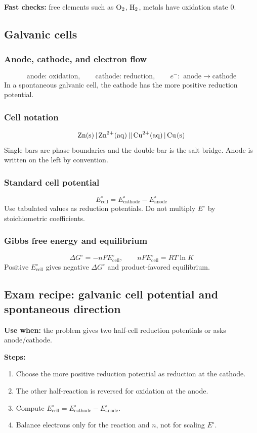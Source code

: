 \textbf{Fast checks:} free elements such as \(\ce{O2}\), \(\ce{H2}\), metals have oxidation state \(0\).

\subsection{Galvanic cells}

\subsubsection{Anode, cathode, and electron flow}
\[
\text{anode: oxidation}, \qquad \text{cathode: reduction}, \qquad e^-:\text{ anode}\rightarrow\text{cathode}
\]
In a spontaneous galvanic cell, the cathode has the more positive reduction potential.

\subsubsection{Cell notation}
\[
\ce{Zn(s) | Zn^2+(aq) || Cu^2+(aq) | Cu(s)}
\]
Single bars are phase boundaries and the double bar is the salt bridge. Anode is written on the left by convention.

\subsubsection{Standard cell potential}
\[
E^\circ_{\mathrm{cell}}=E^\circ_{\mathrm{cathode}}-E^\circ_{\mathrm{anode}}
\]
Use tabulated values as reduction potentials. Do not multiply \(E^\circ\) by stoichiometric coefficients.

\subsubsection{Gibbs free energy and equilibrium}
\[
\Delta G^\circ=-nFE^\circ_{\mathrm{cell}}, \qquad
nFE^\circ_{\mathrm{cell}}=RT\ln K
\]
Positive \(E^\circ_{\mathrm{cell}}\) gives negative \(\Delta G^\circ\) and product-favored equilibrium.

\subsection{Exam recipe: galvanic cell potential and spontaneous direction}
\textbf{Use when:} the problem gives two half-cell reduction potentials or asks anode/cathode.

\textbf{Steps:}
\begin{enumerate}
    \item Choose the more positive reduction potential as reduction at the cathode.
    \item The other half-reaction is reversed for oxidation at the anode.
    \item Compute \(E^\circ_{\mathrm{cell}}=E^\circ_{\mathrm{cathode}}-E^\circ_{\mathrm{anode}}\).
    \item Balance electrons only for the reaction and \(n\), not for scaling \(E^\circ\).
\end{enumerate}

